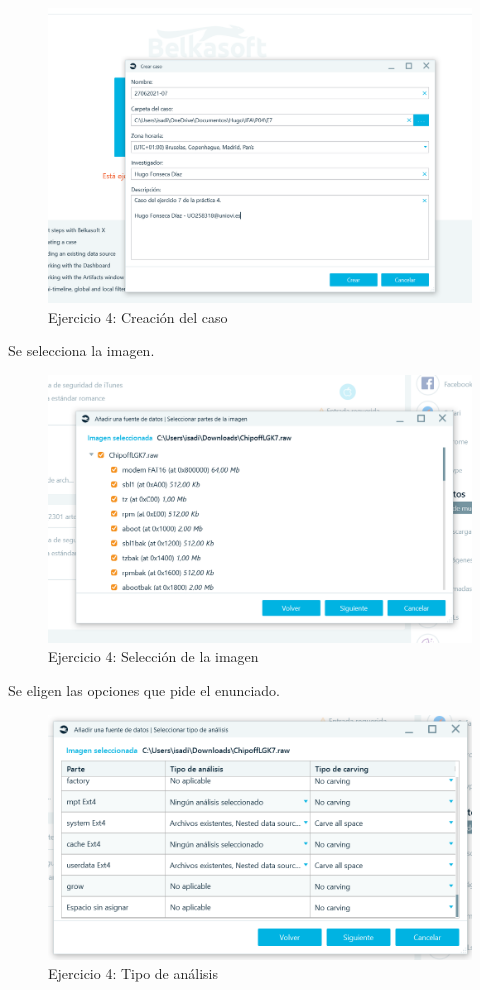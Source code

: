 \documentclass[11pt]{article}
\begin{document}
\begin{figure}[H]
    \caption{Ejercicio 4: Creación del caso}
    \centering
    \includegraphics[scale=0.6]{p04/e7-1.PNG}
\end{figure}

Se selecciona la imagen.

\begin{figure}[H]
    \caption{Ejercicio 4: Selección de la imagen}
    \centering
    \includegraphics[scale=0.7]{p04/e7-2.PNG}
\end{figure}

Se eligen las opciones que pide el enunciado.

\begin{figure}[H]
    \caption{Ejercicio 4: Tipo de análisis}
    \centering
    \includegraphics[scale=0.7]{p04/e7-3.PNG}
\end{figure}
\end{document}
